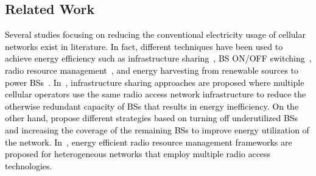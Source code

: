 \documentclass[10pt, letter,twocolumn]{IEEEtran}
\begin{document}
\vspace{-0.0cm}
\subsection{Related Work}
\textcolor{black}{Several studies focusing on reducing the conventional electricity usage of cellular networks exist in literature. In fact, different techniques have been used to achieve energy efficiency such as infrastructure sharing~\cite{suggested2,infrastructure_sharing_recent}, BS ON/OFF switching~\cite{forced_reference_1,on_off_recent,switching_off_recent}, radio resource management~\cite{resource_management_recent,hakim_vtc}, and energy harvesting from renewable sources to power BSs~\cite{solar_powered_BS,solar_installation,suggested3}.
In~\cite{suggested2,infrastructure_sharing_recent}, infrastructure sharing approaches are proposed where multiple cellular operators use the same radio access network infrastructure to reduce the otherwise redundant capacity of BSs that results in energy inefficiency. On the other hand,\cite{forced_reference_1,on_off_recent,switching_off_recent} propose different strategies based on turning off underutilized BSs and increasing the coverage of the remaining BSs to improve energy utilization of the network.
In~\cite{resource_management_recent,hakim_vtc}, energy efficient radio resource management frameworks are proposed for heterogeneous networks that employ multiple radio access technologies.
}
\end{document}
